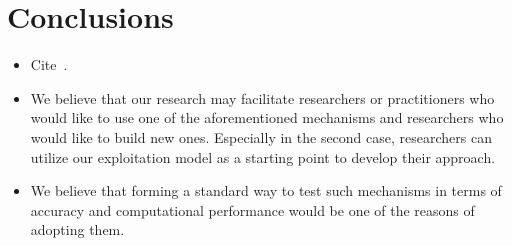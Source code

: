 \documentclass[conference]{IEEEtran}
\begin{document}

\section{Conclusions}
\label{sec:conclusion}


\begin{itemize}
\item Cite~\cite{HNSHS12,DKH14}.
\item We believe that our research may facilitate researchers
or practitioners who would like to use one of the
aforementioned mechanisms and researchers who would like
to build new ones. Especially in the second case,
researchers can utilize our exploitation model as a
starting point to develop their approach.
\item We believe that forming a
standard way to test such mechanisms in terms
of accuracy and computational performance
would be one of the reasons of adopting them.
\end{itemize}



\end{document}
